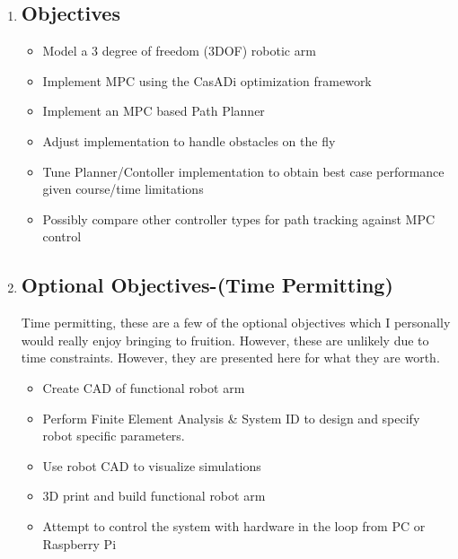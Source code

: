 \documentclass[12px]{article}
\begin{document}
    \begin{enumerate}
        \item     \subsection*{Objectives}

        \begin{itemize}
            \item Model a 3 degree of freedom (3DOF) robotic arm
            \item Implement MPC using the CasADi optimization framework
            \item Implement an MPC based Path Planner
            \item Adjust implementation to handle obstacles on the fly
            \item Tune Planner/Contoller implementation to obtain best case performance given course/time limitations
            \item Possibly compare other controller types for path tracking against MPC control
        \end{itemize}


        \item \subsection*{Optional Objectives-(Time Permitting)}

        Time permitting, these are a few of the optional objectives which I personally would really enjoy bringing to fruition. However, these are unlikely due to time constraints. However, they are presented here for what they are worth.

        \begin{itemize}
            \item Create CAD of functional robot arm
            \item Perform Finite Element Analysis \& System ID to design and specify robot specific parameters.
            \item Use robot CAD to visualize simulations
            \item 3D print and build functional robot arm
            \item Attempt to control the system with hardware in the loop from PC or Raspberry Pi
        \end{itemize}
    \end{enumerate}
\end{document}
